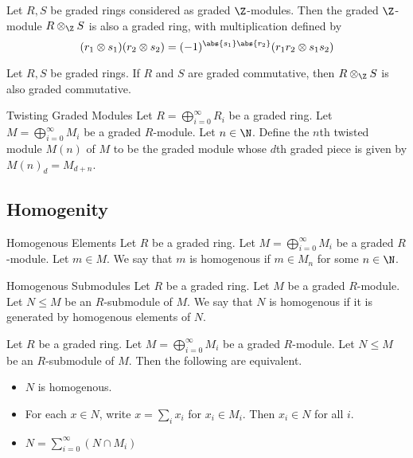 \documentclass[a4paper]{article}
\begin{document}
\begin{prp}{}{} Let $R,S$ be graded rings considered as graded $\Z$-modules. Then the graded $\Z$-module $R\otimes_\Z S$ is also a graded ring, with multiplication defined by $$(r_1\otimes s_1)(r_2\otimes s_2)=(-1)^{\abs{s_1}\abs{r_2}}(r_1r_2\otimes s_1s_2)$$
\end{prp}

\begin{lmm}{}{} Let $R,S$ be graded rings. If $R$ and $S$ are graded commutative, then $R\otimes_\Z S$ is also graded commutative. 
\end{lmm}

\begin{defn}{Twisting Graded Modules}{} Let $R=\bigoplus_{i=0}^\infty R_i$ be a graded ring. Let $M=\bigoplus_{i=0}^\infty M_i$ be a graded $R$-module. Let $n\in\N$. Define the $n$th twisted module $M(n)$ of $M$ to be the graded module whose $d$th graded piece is given by $M(n)_d=M_{d+n}$. 
\end{defn}

\subsection{Homogenity}
\begin{defn}{Homogenous Elements}{} Let $R$ be a graded ring. Let $M=\bigoplus_{i=0}^\infty M_i$ be a graded $R$-module. Let $m\in M$. We say that $m$ is homogenous if $m\in M_n$ for some $n\in\N$. 
\end{defn}

\begin{defn}{Homogenous Submodules}{} Let $R$ be a graded ring. Let $M$ be a graded $R$-module. Let $N\leq M$ be an $R$-submodule of $M$. We say that $N$ is homogenous if it is generated by homogenous elements of $N$. 
\end{defn}

\begin{lmm}{}{} Let $R$ be a graded ring. Let $M=\bigoplus_{i=0}^\infty M_i$ be a graded $R$-module. Let $N\leq M$ be an $R$-submodule of $M$. Then the following are equivalent. 
\begin{itemize}
\item $N$ is homogenous. 
\item For each $x\in N$, write $x=\sum_ix_i$ for $x_i\in M_i$. Then $x_i\in N$ for all $i$. 
\item $N=\sum_{i=0}^\infty(N\cap M_i)$
\end{itemize}
\end{lmm}
\end{document}
